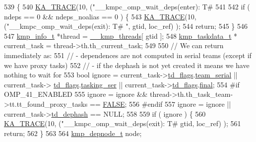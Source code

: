 \begin{DoxyCode}
539 \{
540     \hyperlink{kmp__debug_8h_a21d51f37cb197aca5ffe737531678830}{KA\_TRACE}(10, (\textcolor{stringliteral}{"\_\_kmpc\_omp\_wait\_deps(enter): T#%
541 
542     \textcolor{keywordflow}{if} ( ndeps == 0 && ndeps\_noalias == 0 ) \{
543         \hyperlink{kmp__debug_8h_a21d51f37cb197aca5ffe737531678830}{KA\_TRACE}(10, (\textcolor{stringliteral}{"\_\_kmpc\_omp\_wait\_deps(exit): T#%
      "}, gtid, loc\_ref) );
544         \textcolor{keywordflow}{return};
545     \}
546 
547     \hyperlink{kmp_8h_a194859801fe16b326efe34501a37c30a}{kmp\_info\_t} *thread = \hyperlink{kmp_8h_a8ba907eb5a2568ff55a49a1504cd3624}{\_\_kmp\_threads}[ gtid ];
548     \hyperlink{structkmp__taskdata}{kmp\_taskdata\_t} * current\_task = thread->th.th\_current\_task;
549 
550     \textcolor{comment}{// We can return immediately as:}
551     \textcolor{comment}{//   - dependences are not computed in serial teams (except if we have proxy tasks)}
552     \textcolor{comment}{//   - if the dephash is not yet created it means we have nothing to wait for}
553     \textcolor{keywordtype}{bool} ignore = current\_task->\hyperlink{structkmp__taskdata_aa6380b6723d2482345a1e6cffcd15e9f}{td\_flags}.\hyperlink{structkmp__tasking__flags_a69abf7c2ecf0b7284861a90c7ac0cfe1}{team\_serial} || current\_task->
      \hyperlink{structkmp__taskdata_aa6380b6723d2482345a1e6cffcd15e9f}{td\_flags}.\hyperlink{structkmp__tasking__flags_a68f882661553dde50d4ccc2e472e9f05}{tasking\_ser} || current\_task->\hyperlink{structkmp__taskdata_aa6380b6723d2482345a1e6cffcd15e9f}{td\_flags}.\hyperlink{structkmp__tasking__flags_adc49b76236bc45b6c68457f8e81230b7}{final};
554 \textcolor{preprocessor}{#if OMP\_41\_ENABLED}
555 \textcolor{preprocessor}{}    ignore = ignore && thread->th.th\_task\_team->tt.tt\_found\_proxy\_tasks == \hyperlink{kmp_8h_aa93f0eb578d23995850d61f7d61c55c1}{FALSE};
556 \textcolor{preprocessor}{#endif}
557 \textcolor{preprocessor}{}    ignore = ignore || current\_task->\hyperlink{structkmp__taskdata_a428a82593aa88b9d2420390cdee239d8}{td\_dephash} == NULL;
558 
559     \textcolor{keywordflow}{if} ( ignore ) \{
560         \hyperlink{kmp__debug_8h_a21d51f37cb197aca5ffe737531678830}{KA\_TRACE}(10, (\textcolor{stringliteral}{"\_\_kmpc\_omp\_wait\_deps(exit): T#%
      gtid, loc\_ref) );
561         \textcolor{keywordflow}{return};
562     \}
563 
564     \hyperlink{unionkmp__depnode}{kmp\_depnode\_t} node;
}}
\end{DoxyCode}
